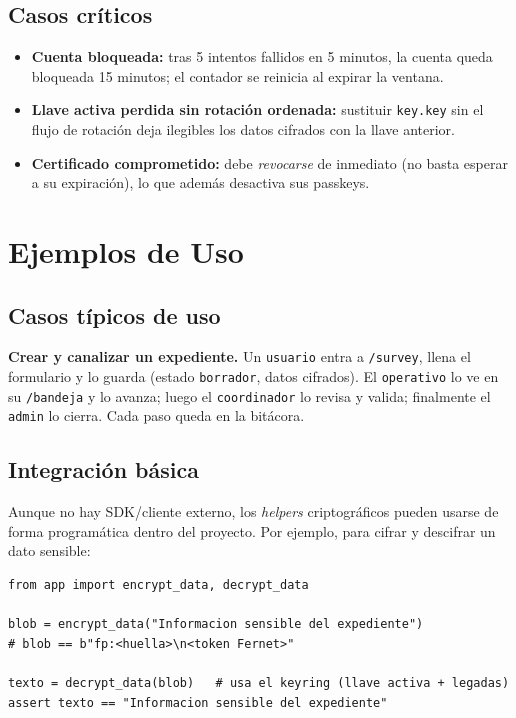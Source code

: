 \documentclass[10pt,letterpaper]{report}
\begin{document}
\section{Casos cr\'iticos}
\begin{itemize}
  \item \textbf{Cuenta bloqueada:} tras 5 intentos fallidos en 5 minutos, la cuenta queda bloqueada 15
  minutos; el contador se reinicia al expirar la ventana.
  \item \textbf{Llave activa perdida sin rotaci\'on ordenada:} sustituir \texttt{key.key} sin el flujo
  de rotaci\'on deja ilegibles los datos cifrados con la llave anterior.
  \item \textbf{Certificado comprometido:} debe \emph{revocarse} de inmediato (no basta esperar a su
  expiraci\'on), lo que adem\'as desactiva sus passkeys.
\end{itemize}

\chapter{Ejemplos de Uso}

\section{Casos t\'ipicos de uso}
\textbf{Crear y canalizar un expediente.} Un \texttt{usuario} entra a \texttt{/survey}, llena el
formulario y lo guarda (estado \texttt{borrador}, datos cifrados). El \texttt{operativo} lo ve en su
\texttt{/bandeja} y lo avanza; luego el \texttt{coordinador} lo revisa y valida; finalmente el
\texttt{admin} lo cierra. Cada paso queda en la bit\'acora.

\section{Integraci\'on b\'asica}
Aunque no hay SDK/cliente externo, los \emph{helpers} criptogr\'aficos pueden usarse de forma
program\'atica dentro del proyecto. Por ejemplo, para cifrar y descifrar un dato sensible:
\begin{lstlisting}[style=python]
from app import encrypt_data, decrypt_data

blob = encrypt_data("Informacion sensible del expediente")
# blob == b"fp:<huella>\n<token Fernet>"

texto = decrypt_data(blob)   # usa el keyring (llave activa + legadas)
assert texto == "Informacion sensible del expediente"
\end{lstlisting}
\end{document}
